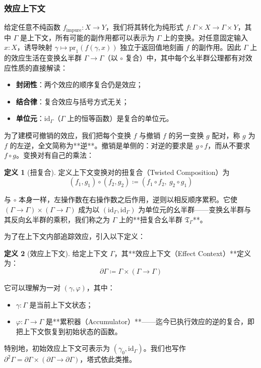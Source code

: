 \documentclass[11pt,a4paper]{article}
\theoremstyle{plain}
\theoremstyle{definition}
\newtheorem{definition}{定义}
\theoremstyle{remark}
\begin{document}
\subsubsection{效应上下文}

给定任意不纯函数 $f_{\text{impure}} : X \to Y$，我们将其转化为纯形式 $f : \Gamma \times X \to \Gamma \times Y$，其中 $\Gamma$ 是上下文，所有可能的副作用都可以表示为 $\Gamma$ 上的变换。对任意固定输入 $x : X$，诱导映射 $\gamma \mapsto \mathrm{pr}_1(f(\gamma, x))$ 独立于返回值地刻画 $f$ 的副作用。因此 $\Gamma$ 上的效应生活在变换幺半群 $\Gamma \to \Gamma$（以 $\circ$ 复合）中，其中每个幺半群公理都有对效应性质的直接解读：

\begin{itemize}
\item \textbf{封闭性}：两个效应的顺序复合仍是效应；
\item \textbf{结合律}：复合效应与括号方式无关；
\item \textbf{单位元}：$\mathrm{id}_\Gamma$（$\Gamma$ 上的恒等函数）是复合的单位元。
\end{itemize}

为了建模可撤销的效应，我们把每个变换 $f$ 与撤销 $f$ 的另一变换 $g$ 配对，称 $g$ 为 $f$ 的左逆，全文简称为**逆**。撤销是单侧的：对逆的要求是 $g \circ f$，而从不要求 $f \circ g$。变换对有自己的乘法：

\begin{definition}[扭复合]
定义上下文变换对的扭复合（Twisted Composition）为
\[
(f_1, g_1) \circ (f_2, g_2) \coloneqq (f_1 \circ f_2,\ g_2 \circ g_1) \tag{4}
\]
\end{definition}

与 $\circ$ 本身一样，左操作数在右操作数之后作用，逆则以相反顺序累积。它使 $(\Gamma \to \Gamma) \times (\Gamma \to \Gamma)$ 成为以 $(\mathrm{id}_\Gamma, \mathrm{id}_\Gamma)$ 为单位元的幺半群——变换幺半群与其反向幺半群的乘积，我们称之为 $\Gamma$ 上的**扭复合幺半群 $\mathfrak{T}_\Gamma$**。

为了在上下文内部追踪效应，引入以下定义：

\begin{definition}[效应上下文]
给定上下文 $\Gamma$，其**效应上下文（Effect Context）**定义为：
\[
\partial\Gamma \coloneqq \Gamma \times (\Gamma \to \Gamma) \tag{5}
\]
\end{definition}

它可以理解为一对 $(\gamma, \varphi)$，其中：
\begin{itemize}
\item $\gamma : \Gamma$ 是当前上下文状态；
\item $\varphi : \Gamma \to \Gamma$ 是**累积器（Accumulator）**——迄今已执行效应的逆的复合，即把上下文恢复到初始状态的函数。
\end{itemize}
特别地，初始效应上下文可表示为 $(\gamma_0, \mathrm{id}_\Gamma)$。我们也写作 $\partial^2\Gamma = \partial\Gamma \times (\partial\Gamma \to \partial\Gamma)$，塔式依此类推。
\end{document}
